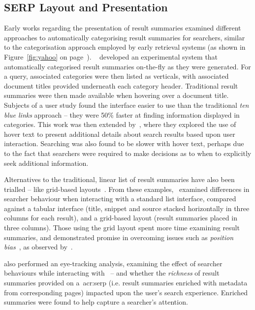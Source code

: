 \subsection{SERP Layout and Presentation}
Early works regarding the presentation of result summaries examined different approaches to automatically categorising result summaries for searchers, similar to the categorisation approach employed by early retrieval systems (as shown in Figure~\ref{fig:yahoo} on page~\pageref{fig:yahoo}). ~\cite{chen2000order_to_web} developed an experimental system that automatically categorised result summaries on-the-fly as they were generated. For a query, associated categories were then listed as verticals, with associated document titles provided underneath each category header. Traditional result summaries were then made available when hovering over a document title. Subjects of a user study found the interface easier to use than the traditional \emph{ten blue links} approach -- they were 50\% faster at finding information displayed in categories. This work was then extended by~\cite{dumais2001results_in_context}, where they explored the use of hover text to present additional details about search results based upon user interaction. Searching was also found to be slower with hover text, perhaps due to the fact that searchers were required to make decisions as to when to explicitly seek additional information.

Alternatives to the traditional, linear list of result summaries have also been trialled -- like grid-based layouts~\citep{resnick2001modeling, kammerer2010interface, chierichetti2011two_dimensional_presentation}. From these examples,~\cite{kammerer2010interface} examined differences in searcher behaviour when interacting with a standard list interface, compared against a tabular interface (title, snippet and source stacked horizontally in three columns for each result), and a grid-based layout (result summaries placed in three columns). Those using the grid layout spent more time examining result summaries, and demonstrated promise in overcoming issues such as \emph{position bias}~\citep{craswell2008click_models}, as observed by~\cite{joachims2005click_model}.

\cite{marcos2015snippets_web_search} also performed an eye-tracking analysis, examining the effect of searcher behaviours while interacting with~ -- and whether the \emph{richness} of result summaries provided on a~\gls{acr:serp} (i.e. result summaries enriched with metadata from corresponding pages) impacted upon the user's search experience. Enriched summaries were found to help capture a searcher's attention. 

